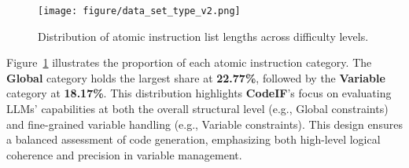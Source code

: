 \begin{figure}
    \centering
    \texttt{[image: figure/data\_set\_type\_v2.png]}
    \caption{Distribution of atomic instruction list lengths across difficulty levels.}
    \label{fig:data_set_type}
\end{figure}

Figure~\ref{fig:data_set_type} illustrates the proportion of each atomic instruction category. The \textbf{Global} category holds the largest share at \textbf{22.77\%}, followed by the \textbf{Variable} category at \textbf{18.17\%}. This distribution highlights \textbf{CodeIF}’s focus on evaluating LLMs' capabilities at both the overall structural level (e.g., Global constraints) and fine-grained variable handling (e.g., Variable constraints). This design ensures a balanced assessment of code generation, emphasizing both high-level logical coherence and precision in variable management.



